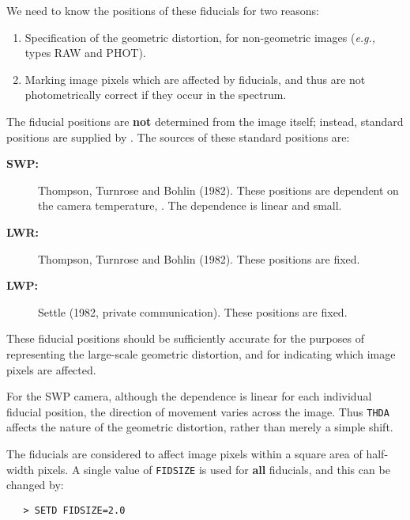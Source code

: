 We need to know the positions of these fiducials for two reasons:

\begin{enumerate}

\item Specification of the geometric distortion, for non-geometric images
      ({\it{e.g.,}} types RAW and PHOT)\@.

\item Marking image pixels which are affected by fiducials, and thus are not
      photometrically correct if they occur in the spectrum.

\end{enumerate}

The fiducial positions are {\bf not} determined from the image itself; instead,
standard positions are supplied by \@.
The sources of these standard positions are:

\begin{description}

\item [{\bf SWP:}]
      Thompson, Turnrose and Bohlin (1982)\@.  These positions are
      dependent on the camera temperature, \@.
      The dependence is linear and small.

\item [{\bf LWR:}]
      Thompson, Turnrose and Bohlin (1982)\@.  These positions are fixed.

\item [{\bf LWP:}]
      Settle (1982, private communication)\@.  These positions are fixed.

\end{description}

These fiducial positions should be sufficiently accurate for the purposes
of representing the large-scale geometric distortion, and for indicating which
image pixels are affected.

For the SWP camera, although the 
 dependence is linear for each
individual fiducial position, the direction of movement varies across the
image.  Thus \verb+THDA+ affects the nature of the geometric distortion, rather
than merely a simple shift.

The fiducials are considered to affect image pixels within a square area
of half-width 
 pixels.  A single value of \verb+FIDSIZE+ is used
for {\bf all} fiducials, and this can be changed by:

\begin{verbatim}
   > SETD FIDSIZE=2.0
\end{verbatim}


